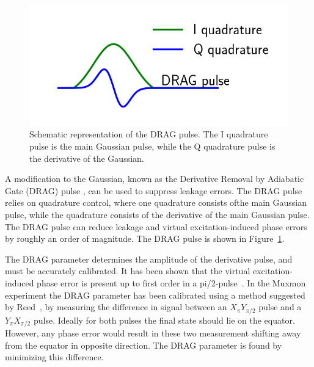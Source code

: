         \begin{figure}
          \begin{center}
          \vspace{-30pt}
            \includegraphics[width=\textwidth]{../Figures/Exploring frequency re-use/DRAG pulse.png}
          \end{center}
          \vspace{-20 pt}
          \caption{Schematic representation of the DRAG pulse. The I quadrature pulse is the main Gaussian pulse, while the Q quadrature pulse is the derivative of the Gaussian.}
          \label{fig:DRAG pulse}
        \end{figure}

        A modification to the Gaussian, known as the Derivative Removal by Adiabatic Gate (DRAG) pulse \cite{motzoi2009simple}, can be used to suppress leakage errors. The DRAG pulse relies on quadrature control, where one quadrature consists ofthe main Gaussian pulse, while the quadrature consists of the derivative of the main Gaussian pulse. The DRAG pulse can reduce leakage and virtual excitation-induced phase errors by roughly an order of magnitude. The DRAG pulse is shown in Figure~\ref{fig:DRAG pulse}.

        The DRAG parameter determines the amplitude of the derivative pulse, and must be accurately calibrated. It has been shown that the virtual excitation-induced phase error is present up to first order in a pi/2-pulse~\cite{lucero2010reduced}. In the Muxmon experiment the DRAG parameter has been calibrated using a method suggested by Reed~\cite{Reed}, by measuring the difference in signal between an $X_{\pi} Y_{\pi/2}$ pulse and a $Y_{\pi} X_{\pi/2}$ pulse. Ideally for both pulses the final state should lie on the equator. However, any phase error would result in these two measurement shifting away from the equator in opposite direction. The DRAG parameter is found by minimizing this difference.


